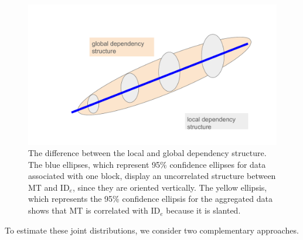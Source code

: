 \documentclass[acmlarge, manuscript,review]{acmart}
\newcommand{\ide}{\ensuremath{{\text{ID}_e}}\xspace}
\begin{document}
\begin{figure}[htbp]
	\centering
	\includegraphics[width=.8\textwidth]{tmp.pdf}
	\caption{The difference between the local and global dependency structure. The blue ellipses, which represent 95\% confidence ellipses for data associated with one block, display an uncorrelated structure between MT and \ide, since they are oriented vertically. The yellow ellipsis, which represents the 95\% confidence ellipsis for the aggregated data shows that MT is correlated with \ide because it is slanted.}
	\label{fig:global_local_dep}
\end{figure}

To estimate these joint distributions, we consider two complementary approaches.
\end{document}

